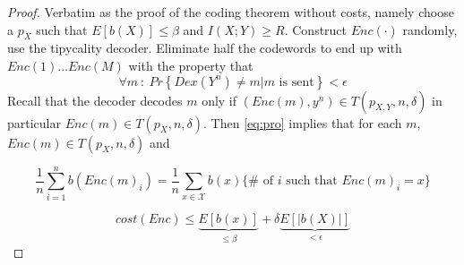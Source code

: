 \documentclass[twoside]{article}
\theoremstyle{definition} %
\renewcommand{\Pr}[1]{Pr\left\{#1\right\}}
\newcommand{\Ex}[1]{E\left[#1\right]}
\def\X{\mathcal{X}}
\begin{document}
\begin{proof}
  Verbatim as the proof of the coding theorem without costs, namely choose a $p_X$ such that $\Ex{b(X)} \leq \beta$ and $I(X;Y) \geq R$. Construct $Enc(\cdot)$ randomly, use the tipycality decoder. Eliminate half the codewords to end up with $Enc(1) \dots Enc(M)$ with the property that
  \begin{equation}
    \label{eq:pro}
    \forall m~:~\Pr{Dex(Y^n) \not = m | m \text{ is sent}} < \epsilon
  \end{equation}
  Recall that the decoder decodes $m$ only if $(Enc(m), y^n) \in T(p_{X,Y}, n, \delta)$ in particular $Enc(m) \in T(p_X, n, \delta)$. Then \cref{eq:pro} implies that for each $m$, $Enc(m) \in T(p_X, n, \delta)$ and

  \[
    \frac 1 n \sum_{i=1}^n b(Enc(m)_i) = \frac 1 n \sum_{x\in \X} b(x) \{ \# \text{ of } i \text{ such that } Enc(m)_i = x\}
  \]

  \[
    cost(Enc) \leq \underbrace{\Ex{b(x)}}_{\leq \beta} + \delta \underbrace{\Ex{|b(X)|}}_{< \epsilon}
  \]
\end{proof}
\end{document}

